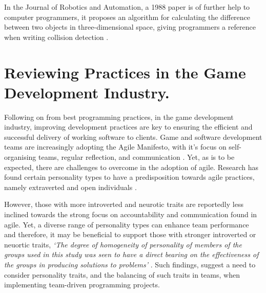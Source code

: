 \documentclass{scrartcl}
\begin{document}
In the Journal of Robotics and Automation, a 1988 paper is of further help to computer programmers, it proposes an algorithm for calculating the difference between two objects in three-dimensional space, giving programmers a reference when writing collision detection \cite{Gilbert}. 

\section{Reviewing Practices in the Game Development Industry.}

Following on from best programming practices, in the game development industry, improving development practices are key to ensuring the efficient and successful delivery of working software to clients. Game and software development teams are increasingly adopting the Agile Manifesto, with it's focus on self-organising teams, regular reflection, and communication \cite{Agile}. Yet, as is to be expected, there are challenges to overcome in the adoption of agile. Research has found certain personality types to have a predisposition towards agile practices, namely extraverted and open individuals \cite{BishopDeokar}. 

However, those with more introverted and neurotic traits are reportedly less inclined towards the strong focus on accountability and communication found in agile. Yet, a diverse range of personality types can enhance team performance and therefore, it may be beneficial to support those with stronger introverted or neuortic traits, \textit{`The degree of homogeneity of personality of members of the groups used in this study was seen to have a direct bearing on the effectiveness of the groups in producing solutions to problems'} \cite{Hoffman}. Such findings, suggest a need to consider personality traits, and the balancing of such traits in teams, when implementing team-driven programming projects.



\end{document}
